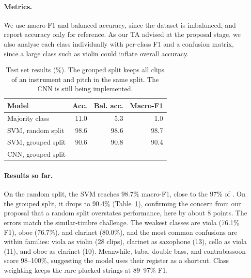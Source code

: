 \documentclass[11pt]{article}
\begin{document}
\paragraph{Metrics.} We use macro-F1 and balanced accuracy, since the dataset is imbalanced, and report accuracy only for reference. As our TA advised at the proposal stage, we also analyse each class individually with per-class F1 and a confusion matrix, since a large class such as violin could inflate overall accuracy.

\begin{table}[t]
  \centering
  \small
  \begin{tabular}{lrrr}
    \hline
    \textbf{Model} & \textbf{Acc.} & \textbf{Bal. acc.} & \textbf{Macro-F1} \\
    \hline
    Majority class          & 11.0 & 5.3 & 1.0 \\
    SVM, random split       & 98.6 & 98.6 & 98.7 \\
    SVM, grouped split      & 90.6 & 90.8 & 90.4 \\
    CNN, grouped split      & -- & -- & -- \\
    \hline
  \end{tabular}
  \caption{\label{tab:results}
    Test set results (\%). The grouped split keeps all clips of an instrument and pitch in the same split. The CNN is still being implemented.
  }
\end{table}

\paragraph{Results so far.} On the random split, the SVM reaches 98.7\% macro-F1, close to the 97\% of \citet{mahanta2021deep}. On the grouped split, it drops to 90.4\% (Table~\ref{tab:results}), confirming the concern from our proposal that a random split overstates performance, here by about 8 points. The errors match the similar-timbre challenge. The weakest classes are viola (76.1\% F1), oboe (76.7\%), and clarinet (80.0\%), and the most common confusions are within families: viola as violin (28 clips), clarinet as saxophone (13), cello as viola (11), and oboe as clarinet (10). Meanwhile, tuba, double bass, and contrabassoon score 98--100\%, suggesting the model uses their register as a shortcut. Class weighting keeps the rare plucked strings at 89--97\% F1.
\end{document}
